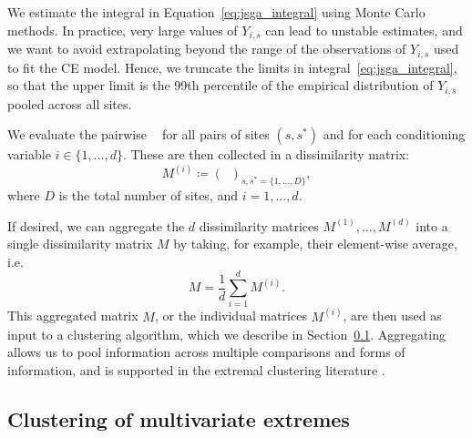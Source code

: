 \documentclass[12pt,compact]{article}
\newcommand{\eJSGa}[1]{\mathop{\mathrm{eJS}_{i, #1}^{\mathrm{G}_{\lambda}}}\nolimits}
\begin{document}
We estimate the integral in Equation~\eqref{eq:jsga_integral} using Monte Carlo methods. 
In practice, very large values of $Y_{i, s}$ can lead to unstable estimates, and we want to avoid extrapolating beyond the range of the observations of $Y_{i, s}$ used to fit the CE model. 
Hence, we truncate the limits in integral~\eqref{eq:jsga_integral}, so that the upper limit is the 99th percentile of the empirical distribution of $Y_{i, s}$ pooled across all sites. 

We evaluate the pairwise $\eJSGa{s, s^*}$ for all pairs of sites $(s, s^*)$ and for each conditioning variable $i \in \{1, \ldots, d\}$. 
These are then collected in a dissimilarity matrix:
\begin{equation} \label{eq:distance_matrix}
  M^{(i)} \coloneq \left(\eJSGa{s, s^*} \right)_{s, s^* = \{1, \ldots, D\}},
\end{equation}
where $D$ is the total number of sites, and $i = 1, \ldots, d$.

If desired, we can aggregate the $d$ dissimilarity matrices $M^{(1)}, \ldots, M^{(d)}$ into a single dissimilarity matrix $M$ by taking, for example, their element-wise average, i.e. 
\begin{equation} \label{eq:aggregate_matrix}
  M = \frac{1}{d} \sum_{i=1}^d M^{(i)}.
\end{equation}
This aggregated matrix $M$, or the individual matrices $M^{(i)}$, are then used as input to a clustering algorithm, which we describe in Section~\ref{subsec:clustering}.
Aggregating allows us to pool information across multiple comparisons and forms of information, and is supported in the extremal clustering literature \citep{Mornet2017-is}.

\subsection{Clustering of multivariate extremes}
\label{subsec:clustering}
\end{document}
